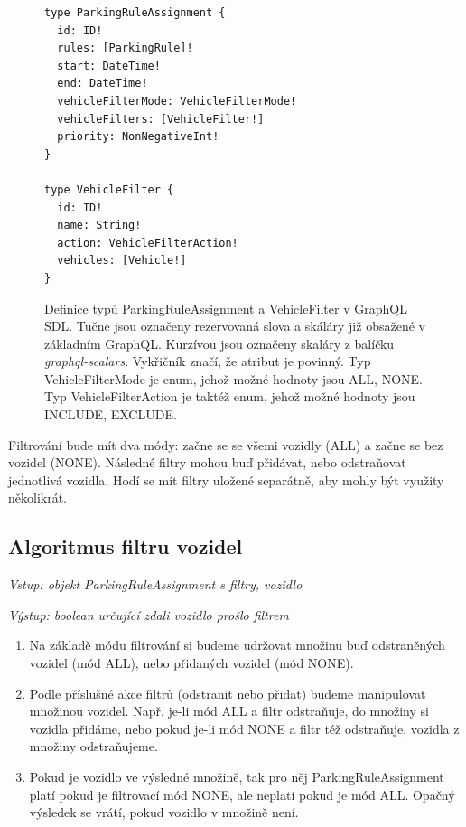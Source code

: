 \begin{figure}[!htb]
\lstset{language=GraphQL}
\begin{lstlisting}
type ParkingRuleAssignment {
  id: ID!
  rules: [ParkingRule]!
  start: DateTime!
  end: DateTime!
  vehicleFilterMode: VehicleFilterMode!
  vehicleFilters: [VehicleFilter!]
  priority: NonNegativeInt!
}

type VehicleFilter {
  id: ID!
  name: String!
  action: VehicleFilterAction!
  vehicles: [Vehicle!]
}
\end{lstlisting}
\caption[Definice typů ParkingRuleAssignment a VehicleFilter v GraphQL SDL.]{Definice typů ParkingRuleAssignment a VehicleFilter v GraphQL SDL.
Tučne jsou označeny rezervovaná slova a skáláry již obsažené v základním GraphQL.
Kurzívou jsou označeny skaláry z balíčku \textit{graphql-scalars}.
Vykřičník značí, že atribut je povinný.
Typ VehicleFilterMode je enum, jehož možné hodnoty jsou ALL, NONE.
Typ VehicleFilterAction je taktéž enum, jehož možné hodnoty jsou INCLUDE, EXCLUDE.}
\label{fig:type_pra_vf}
\end{figure}

Filtrování bude mít dva módy: začne se se všemi vozidly (ALL) a začne se bez vozidel (NONE).
Následné filtry mohou buď přidávat, nebo odstraňovat jednotlivá vozidla.
Hodí se mít filtry uložené separátně, aby mohly být využity několikrát.

\subsection{Algoritmus filtru vozidel}

\noindent
\textit{Vstup: objekt ParkingRuleAssignment s filtry, vozidlo}

\noindent
\textit{Výstup: boolean určující zdali vozidlo prošlo filtrem}

\begin{enumerate}
  \setlength\itemsep{.05em}
  \item Na základě módu filtrování si budeme udržovat množinu buď odstraněných vozidel (mód ALL), nebo přidaných vozidel (mód NONE).
  \item Podle příslušné akce filtrů (odstranit nebo přidat) budeme manipulovat množinou vozidel.
        Např. je-li mód ALL a filtr odstraňuje, do množiny si vozidla přidáme, nebo pokud je-li mód NONE a filtr též odstraňuje, vozidla z množiny odstraňujeme.
  \item Pokud je vozidlo ve výsledné množině, tak pro něj ParkingRuleAssignment platí pokud je filtrovací mód NONE,
        ale neplatí pokud je mód ALL. Opačný výsledek se vrátí, pokud vozidlo v množině není.
\end{enumerate}

